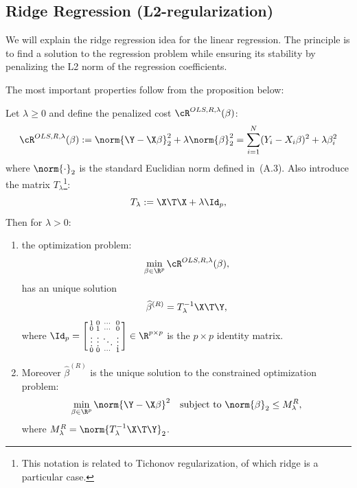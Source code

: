\subsection{Ridge Regression (L2-regularization)}

We will explain the ridge regression idea for the linear regression. The principle
is to find a solution to the regression problem while ensuring its stability by
penalizing the L2 norm of the regression coefficients.

The most important properties follow from the proposition below:

\begin{proposition}\label{prop:ch4-ridge}
Let $\lambda \ge 0$ and define the penalized cost $\cR^{OLS, R, \lambda}(\beta)$:
\begin{equation}\label{eq:ch4-ridge-cost}
\cR^{OLS, R, \lambda}(\beta) := \norm{\Y - \X \beta}_2^2 + \lambda \norm{\beta}_2^2
= \sum_{i=1}^N (Y_i - X_i \beta)^2 + \lambda \beta_i^2
\end{equation}
where $\norm{\cdot}_2$ is the standard Euclidian norm defined in~(A.3). Also introduce
the matrix $T_\lambda$\footnote{This notation is related to Tichonov regularization, of which ridge is a particular case.}:
\begin{equation}\label{eq:ch4-T-lambda}
T_\lambda := \X\T \X + \lambda \Id_p,
\end{equation}
Then for $\lambda > 0$:
\begin{enumerate}
\item the optimization problem:
\begin{equation}\label{eq:ch4-ridge-min}
\min_{\beta \in \R^p} \cR^{OLS, R, \lambda}(\beta),
\end{equation}
has an unique solution
\begin{equation}\label{eq:ch4-ridge-sol}
\widehat{\beta}^{(R)} = T_\lambda^{-1} \X\T \Y,
\end{equation}
where $\Id_p = \left[\begin{smallmatrix} 1 & 0 & \cdots & 0 \\ 0 & 1 & \cdots & 0 \\ \vdots & \vdots & \ddots & \vdots \\ 0 & 0 & \cdots & 1 \end{smallmatrix}\right] \in \R^{p \times p}$ is the $p \times p$ identity matrix.

\item Moreover $\widehat{\beta}^{(R)}$ is the unique solution to the constrained optimization
problem:
\begin{equation}\label{eq:ch4-ridge-constrained}
\min_{\beta \in \R^p} \norm{\Y - \X \beta}^2 \quad \text{subject to } \norm{\beta}_2 \le M_\lambda^R,
\end{equation}
where $M_\lambda^R = \norm{T_\lambda^{-1} \X\T \Y}_2$.
\end{enumerate}
\end{proposition}


